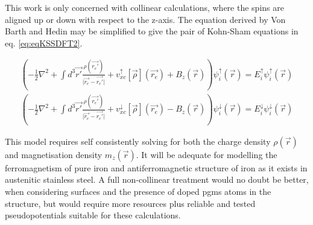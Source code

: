 This work is only concerned with collinear calculations, where the spins are aligned up or down with respect to the z-axis.  The equation derived by Von Barth and Hedin may be simplified to give the pair of Kohn-Sham equations in eq. \ref{eq:eqKSSDFT2}.

\begin{equation}
\begin{split}
\left(-\frac{1}{2} \nabla^2  + \int d^3\vec{r'} \frac{\rho(\vec{r_{e}'})}{\lvert \vec{r_{e}} - \vec{r_{e}'} \rvert} + v^{\uparrow}_{xc}[\vec{\rho}](\vec{r_{e}}) + B_{z}(\vec{r}) \right)\psi^{\uparrow}_{i}(\vec{r}) = E^{\uparrow}_i \psi^{\uparrow}_{i}(\vec{r})  \\
\left(-\frac{1}{2} \nabla^2  + \int d^3\vec{r'} \frac{\rho(\vec{r_{e}'})}{\lvert \vec{r_{e}} - \vec{r_{e}'} \rvert} + v^{\downarrow}_{xc}[\vec{\rho}](\vec{r_{e}}) - B_{z}(\vec{r}) \right)\psi^{\downarrow}_{i}(\vec{r}) = E^{\downarrow}_i \psi^{\downarrow}_{i}(\vec{r})
\label{eq:eqKSSDFT2}
\end{split}
\end{equation}

This model requires self consistently solving for both the charge density $\rho(\vec{r})$ and magnetisation density $m_{z}(\vec{r})$.  It will be adequate for modelling the ferromagnetism of pure iron and antiferromagnetic structure of iron as it exists in austenitic stainless steel.  A full non-collinear treatment would no doubt be better, when considering surfaces and the presence of doped \acrshort{pgm}s atoms in the structure, but would require more resources plus reliable and tested pseudopotentials suitable for these calculations.




